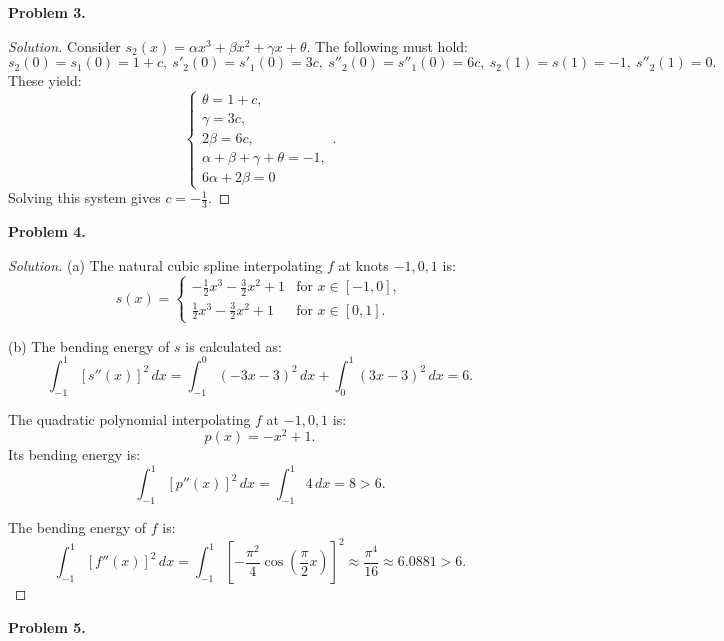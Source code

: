 \documentclass[a4paper]{ctexart}
\begin{document}
\textbf{Problem 3.}

\begin{proof}[Solution]
	Consider $s_2(x)=\alpha x^3+\beta x^2+\gamma x+\theta$. The following must hold:
	$$
		s_2(0)=s_1(0)=1+c, \ s'_2(0)=s'_1(0)=3c, \ s''_2(0)=s''_1(0)=6c, \ s_2(1)=s(1)=-1, \ s''_2(1)=0.
	$$
	These yield:
	$$
		\begin{cases}
			\theta = 1+c,                    \\
			\gamma = 3c,                     \\
			2\beta = 6c,                     \\
			\alpha+\beta+\gamma+\theta = -1, \\
			6\alpha+2\beta=0
		\end{cases}.
	$$
	Solving this system gives $c=-\frac{1}{3}$.
\end{proof}

\textbf{Problem 4.}

\begin{proof}[Solution]
	(a) The natural cubic spline interpolating $f$ at knots $-1,0,1$ is:
	$$
		s(x)=\begin{cases}
			-\frac{1}{2}x^3-\frac{3}{2}x^2+1 & \text{for } x\in[-1,0], \\
			\frac{1}{2}x^3-\frac{3}{2}x^2+1  & \text{for } x\in[0,1].
		\end{cases}
	$$

	(b) The bending energy of $s$ is calculated as:
	$$
		\int_{-1}^1 [s''(x)]^2 \, dx = \int_{-1}^0 (-3x-3)^2 \, dx + \int_{0}^1 (3x-3)^2 \, dx=6.
	$$

	The quadratic polynomial interpolating $f$ at $-1,0,1$ is:
	$$
		p(x)=-x^2+1.
	$$
	Its bending energy is:
	$$
		\int_{-1}^1 [p''(x)]^2 \, dx = \int_{-1}^1 4 \, dx = 8 > 6.
	$$

	The bending energy of $f$ is:
	$$
		\int_{-1}^1 [f''(x)]^2 \, dx = \int_{-1}^1 \left[-\frac{\pi^2}{4}\cos\left(\frac{\pi}{2}x\right)\right]^2 \approx \frac{\pi^4}{16} \approx 6.0881 > 6.
	$$
\end{proof}


\textbf{Problem 5.}
\end{document}
